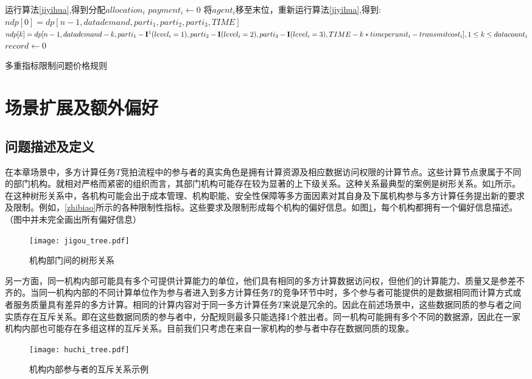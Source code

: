 \documentclass[promaster]{thesis-uestc}
\begin{document}
\begin{algorithm}[H]
    运行算法\ref{jiyihua},得到分配$allocation_i$\;
    {
        $payment_i \leftarrow 0$\;
        将$agent_i$移至末位，重新运行算法\ref{jiyihua},得到:\;
        $ndp[0] = dp[n-1,datademand,parti_1,parti_2,parti_3,TIME]$\;
        $ndp[k] = dp[n-1,datademand-k,parti_1-\mathbf{I\footnotemark}(level_i=1),parti_2-\mathbf{I}(level_i=2),parti_3-\mathbf{I}(level_i=3),TIME-k*timeperunit_i-transmitcost_i],1\leq k\leq datacount_i$\;
        $record \leftarrow 0$\;
    }
\caption{多重指标限制问题价格规则}
\label{dp_zhifu}
\end{algorithm}

\section{场景扩展及额外偏好}
\subsection{问题描述及定义}
在本章场景中，多方计算任务$T$竞拍流程中的参与者的真实角色是拥有计算资源及相应数据访问权限的计算节点。这些计算节点隶属于不同的部门机构。就相对严格而紧密的组织而言，其部门机构可能存在较为显著的上下级关系。这种关系最典型的案例是树形关系。如\ref{jigoushu}所示。在这种树形关系中，各机构可能会出于成本管理、机构职能、安全性保障等多方面因素对其自身及下属机构参与多方计算任务提出新的要求及限制。例如，\ref{zhibiao}所示的各种限制性指标。这些要求及限制形成每个机构的偏好信息。如图\ref{jigoushu}，每个机构都拥有一个偏好信息描述。（图中并未完全画出所有偏好信息）

\begin{figure}[h]
\center
    \texttt{[image: jigou\_tree.pdf]}
    \caption{机构部门间的树形关系}
    \label{jigoushu}
\end{figure}

另一方面，同一机构内部可能具有多个可提供计算能力的单位，他们具有相同的多方计算数据访问权，但他们的计算能力、质量又是参差不齐的。当同一机构内部的不同计算单位作为参与者进入到多方计算任务$T$的竞争环节中时，多个参与者可能提供的是数据相同而计算方式或者服务质量具有差异的多方计算。相同的计算内容对于同一多方计算任务$T$来说是冗余的。因此在前述场景中，这些数据同质的参与者之间实质存在互斥关系。即在这些数据同质的参与者中，分配规则最多只能选择1个胜出者。同一机构可能拥有多个不同的数据源，因此在一家机构内部也可能存在多组这样的互斥关系。目前我们只考虑在来自一家机构的参与者中存在数据同质的现象。
\begin{figure}[h]
    \texttt{[image: huchi\_tree.pdf]}
    \caption{机构内部参与者的互斥关系示例}
    \label{huchishu}
\end{figure}
\end{document}
